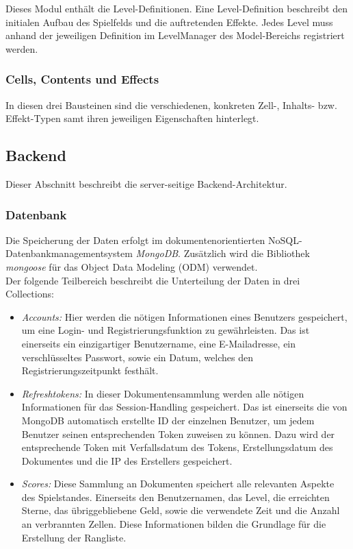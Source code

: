 \documentclass[letterpaper, 10 pt, conference]{ieeeconf}
\begin{document}
Dieses Modul enthält die Level-Definitionen.
Eine Level-Definition beschreibt den initialen Aufbau des Spielfelds und die auftretenden Effekte.
Jedes Level muss anhand der jeweiligen Definition im LevelManager des Model-Bereichs registriert werden.

\subsubsection{Cells, Contents und Effects}

In diesen drei Bausteinen sind die verschiedenen, konkreten Zell-, Inhalts- bzw. Effekt-Typen samt ihren jeweiligen Eigenschaften hinterlegt.

\subsection{Backend}
Dieser Abschnitt beschreibt die server-seitige Backend-Architektur.

\subsubsection{Datenbank} \label{datenbank}

Die Speicherung der Daten erfolgt im dokumentenorientierten NoSQL-Datenbankmanagementsystem \textit{MongoDB}.
Zusätzlich wird die Bibliothek  \textit{mongoose} für das Object Data Modeling (ODM) verwendet. \\
Der folgende Teilbereich beschreibt die Unterteilung der Daten in drei Collections:

\begin{itemize}
\item
\textit{Accounts:} Hier werden die nötigen Informationen eines Benutzers gespeichert, um
eine Login- und Registrierungsfunktion zu gewährleisten. Das ist einerseits ein
einzigartiger Benutzername, eine E-Mailadresse, ein verschlüsseltes Passwort, sowie
ein Datum, welches den Registrierungszeitpunkt festhält.
\item
\textit{Refreshtokens:} In dieser Dokumentensammlung werden alle nötigen Informationen für
das Session-Handling gespeichert. Das ist einerseits die von MongoDB automatisch
erstellte ID der einzelnen Benutzer, um jedem Benutzer seinen entsprechenden Token
zuweisen zu können. Dazu wird der entsprechende Token mit Verfallsdatum
des Tokens,  Erstellungsdatum des Dokumentes und die IP des Erstellers gespeichert.
\item
\textit{Scores:} Diese Sammlung an Dokumenten speichert alle relevanten Aspekte des
Spielstandes. Einerseits den Benutzernamen, das Level, die erreichten Sterne, das
übriggebliebene Geld, sowie die verwendete Zeit und die Anzahl an verbrannten Zellen.
Diese Informationen bilden die Grundlage für die Erstellung der Rangliste.
\end{itemize}
\end{document}
